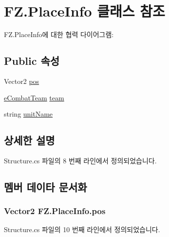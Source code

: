 \hypertarget{class_f_z_1_1_place_info}{}\section{F\+Z.\+Place\+Info 클래스 참조}
\label{class_f_z_1_1_place_info}


F\+Z.\+Place\+Info에 대한 협력 다이어그램\+:
\subsection*{Public 속성}
\begin{DoxyCompactItemize}
\item 
Vector2 \hyperlink{class_f_z_1_1_place_info_adae5129a51ccdd7f4d1c51df12e02237}{pos}
\item 
\hyperlink{_unit_object_8cs_a833537ff3bed216464ac08315287fb12}{e\+Combat\+Team} \hyperlink{class_f_z_1_1_place_info_a4c4273b5ac4af33a2e2bf30bf3df95e2}{team}
\item 
string \hyperlink{class_f_z_1_1_place_info_abd92beeaae0520e38d1ed26698db2d05}{unit\+Name}
\end{DoxyCompactItemize}


\subsection{상세한 설명}


Structure.\+cs 파일의 8 번째 라인에서 정의되었습니다.



\subsection{멤버 데이타 문서화}
\subsubsection[{\texorpdfstring{pos}{pos}}]{\setlength{\rightskip}{0pt plus 5cm}Vector2 F\+Z.\+Place\+Info.\+pos}\hypertarget{class_f_z_1_1_place_info_adae5129a51ccdd7f4d1c51df12e02237}{}\label{class_f_z_1_1_place_info_adae5129a51ccdd7f4d1c51df12e02237}


Structure.\+cs 파일의 10 번째 라인에서 정의되었습니다.

